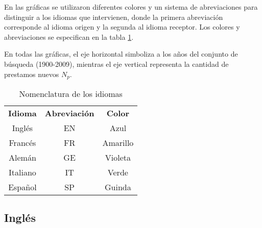 
En las gráficas se utilizaron diferentes colores y un sistema de abreviaciones para distinguir a los idiomas que intervienen, donde la primera abreviación corresponde al idioma origen y la segunda al idioma receptor. Los colores y abreviaciones se especifican  en la tabla \ref{tab.idcolor}. 

En todas las gráficas, el eje horizontal simboliza a los años del conjunto de búsqueda (1900-2009),  mientras el eje vertical representa la cantidad de prestamos nuevos $N_{p}$. 


\begin{table} %
	\centering
	\begin{tabular}{ccc}
		\textbf{Idioma} & \textbf{Abreviación} & \textbf{Color} \\
		Inglés          & EN                   & Azul           \\
		Francés         & FR                   & Amarillo       \\
		Alemán          & GE                   & Violeta        \\
		Italiano        & IT                   & Verde          \\
		Español         & SP                   & Guinda        
	\end{tabular}
	\caption{Nomenclatura de los idiomas}
	\label{tab.idcolor}
\end{table} %




	



\subsection{Inglés} %

